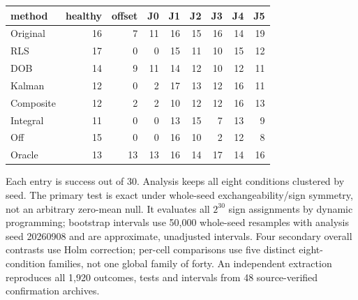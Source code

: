 \documentclass{article}
\begin{document}
\begin{center}\small
\begin{tabular}{lrrrrrrrr}
\toprule
method & healthy & offset & J0 & J1 & J2 & J3 & J4 & J5 \\
\midrule
Original & 16 & 7 & 11 & 16 & 15 & 16 & 14 & 19 \\
RLS & 17 & 0 & 0 & 15 & 11 & 10 & 15 & 12 \\
DOB & 14 & 9 & 11 & 14 & 12 & 10 & 12 & 11 \\
Kalman & 12 & 0 & 2 & 17 & 13 & 12 & 16 & 11 \\
Composite & 12 & 2 & 2 & 10 & 12 & 12 & 16 & 13 \\
Integral & 11 & 0 & 0 & 13 & 15 & 7 & 13 & 9 \\
Off & 15 & 0 & 0 & 16 & 10 & 2 & 12 & 8 \\
Oracle & 13 & 13 & 13 & 16 & 14 & 17 & 14 & 16 \\
\bottomrule
\end{tabular}
\end{center}
Each entry is success out of 30. Analysis keeps all eight conditions clustered by seed.
The primary test is exact under whole-seed exchangeability/sign symmetry, not an arbitrary
zero-mean null. It evaluates all $2^{30}$ sign assignments by dynamic programming;
bootstrap intervals use 50,000 whole-seed resamples with analysis seed 20260908 and are
approximate, unadjusted intervals. Four secondary overall contrasts use Holm correction;
per-cell comparisons use five distinct eight-condition families, not one global family
of forty. An independent extraction reproduces all 1,920 outcomes, tests and intervals
from 48 source-verified confirmation archives.
\end{document}
